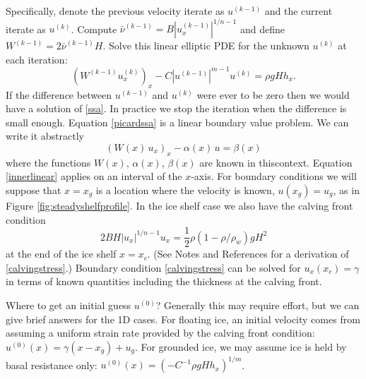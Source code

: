 \documentclass[titlepage,a4paper,final,12pt]{scrartcl}
\begin{document}
Specifically, denote the previous velocity iterate as $u^{(k-1)}$ and the current iterate as $u^{(k)}$.  Compute $\bar \nu^{(k-1)} = B |u^{(k-1)}_x|^{1/n-1}$ and define $W^{(k-1)} = 2 \bar \nu^{(k-1)} H$.  Solve this linear elliptic PDE for the unknown $u^{(k)}$ at each iteration:
\begin{equation}
   \left(W^{(k-1)} u^{(k)}_x\right)_x - C |u^{(k-1)}|^{m-1} u^{(k)} = \rho g H h_x. \label{picardssa}
\end{equation}
If the difference between $u^{(k-1)}$ and $u^{(k)}$ were ever to be zero then we would have a solution of \eqref{ssa}.  In practice we stop the iteration when the difference is small enough.  Equation \eqref{picardssa} is a linear boundary value problem.  We can write it abstractly
\begin{equation}
  \left(W(x)\, u_x\right)_x - \alpha(x)\, u = \beta(x)  \label{innerlinear}
\end{equation}
where the functions $W(x)$, $\alpha(x)$, $\beta(x)$ are known in thiscontext.  Equation \eqref{innerlinear} applies on an interval of the $x$-axis.  For boundary conditions we will suppose that $x=x_g$ is a location where the velocity is known, $u(x_g)=u_g$, as in Figure \ref{fig:steadyshelfprofile}.  In the ice shelf case we also have the calving front condition
\begin{equation}
  2 B H |u_x|^{1/n - 1} u_x = \frac{1}{2}\rho (1-\rho/\rho_w) g H^2  \label{calvingstress}
\end{equation}
at the end of the ice shelf $x=x_c$.  (See Notes and References for a derivation of \eqref{calvingstress}.)  Boundary condition \eqref{calvingstress} can be solved for $u_x(x_c)=\gamma$ in terms of known quantities including the thickness at the calving front.

Where to get an initial guess $u^{(0)}$?  Generally this may require effort, but we can give brief answers for the 1D cases.  For floating ice, an initial velocity comes from assuming a uniform strain rate provided by the calving front condition: $u^{(0)}(x) = \gamma (x-x_g) + u_g$.  For grounded ice, we may assume ice is held by basal resistance only: $u^{(0)}(x) = \left(-C^{-1} \rho g H h_x\right)^{1/m}$.
\end{document}

